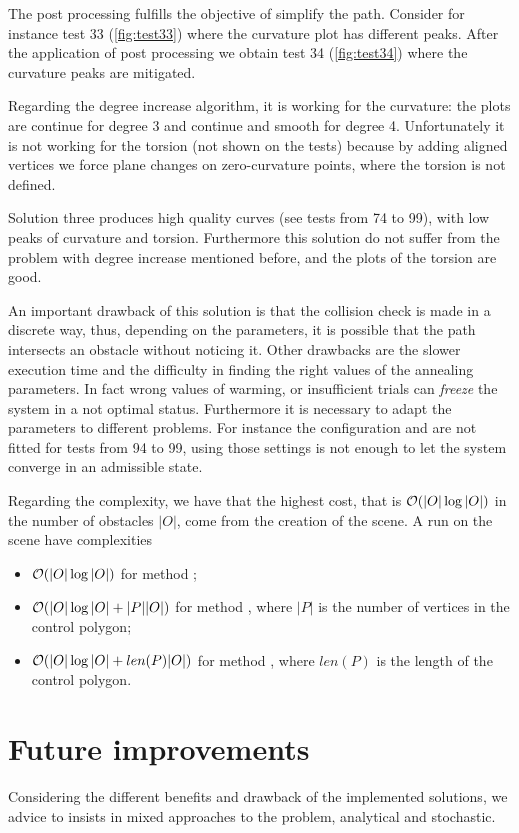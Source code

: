 \documentclass[dissertation.tex]{subfiles}
\begin{document}
The post processing fulfills the
objective of simplify the path. Consider for instance test 33
(\cref{fig:test33}) where the curvature plot has different
peaks. After the application of post processing we obtain test 34
(\cref{fig:test34}) where the curvature peaks are mitigated.

Regarding the degree increase algorithm, it is working for the
curvature: the plots are continue for degree 3 and continue and
smooth for degree 4. Unfortunately it is not working for the torsion
(not shown on the tests) because by adding aligned vertices we force
plane changes on zero-curvature points, where the torsion is not
defined.

Solution three produces high quality curves (see tests from 74 to 99),
with low peaks of curvature and torsion. Furthermore this solution do
not suffer from the problem with degree increase mentioned before, and
the plots of the torsion are good.

An important drawback of this
solution is that the collision check is made in a discrete way, thus,
depending on the parameters, it is possible that the path intersects
an obstacle without noticing it.
Other drawbacks are the slower
execution time and the difficulty in finding the right values of the
annealing parameters. In fact wrong values of warming, or insufficient
trials can \emph{freeze} the system in a not optimal
status. Furthermore it is necessary to adapt the parameters to
different problems. For instance the configuration \annB and \annC are
not fitted for tests from 94 to 99, using those settings is not enough
to let the system converge in an admissible state.

Regarding the complexity, we have that the highest cost, that is
$\mathcal{O}(|O|\log|O|)$ in the number of obstacles $|O|$, come from the
creation of the scene. A run on the scene have complexities 
\begin{itemize}
\item $\mathcal{O}(|O|\log|O|)$ for method \metA;
\item $\mathcal{O}(|O|\log|O|+|P||O|)$ for method \metB, where $|P|$ is the
  number of vertices in the control polygon;
\item $\mathcal{O}(|O|\log|O|+len(P)|O|)$ for method \metC, where $len(P)$
  is the length of the control polygon.
\end{itemize}

\section{Future improvements}
Considering the different benefits and drawback of the implemented
solutions, we advice to insists in mixed approaches to the
problem, analytical and stochastic.
\end{document}
